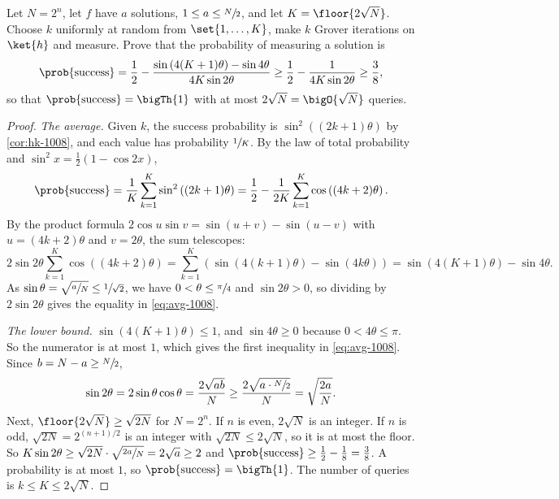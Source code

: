 \begin{exercisebox}
\begin{exercise}\label{ex:randomk-1008}\label{thm:randomk-1008}
    Let $N = 2^n$, let $f$ have $a$ solutions, $1 \leq a \leq \sfrac{N}{2}$, and let
    $K = \floor{2\sqrt{N}}$. Choose $k$ uniformly at random from $\set{1, \dots, K}$, make $k$ Grover
    iterations on $\ket{h}$ and measure. Prove that the probability of measuring a solution is
    \begin{equation}\label{eq:avg-1008}
        \prob{\text{success}} = \frac{1}{2} - \frac{\sin\left(4(K+1)\theta\right) - \sin 4\theta}{4K\sin 2\theta}
        \geq \frac{1}{2} - \frac{1}{4K\sin 2\theta} \geq \frac{3}{8},
    \end{equation}
    so that $\prob{\text{success}} = \bigTh{1}$ with at most $2\sqrt{N} = \bigO{\sqrt{N}}$ queries.
\end{exercise}
\tcblower
\begin{proof}
    \emph{The average.} Given $k$, the success probability is $\sin^2((2k+1)\theta)$ by
    \cref{cor:hk-1008}, and each value has probability $\sfrac{1}{K}$. By the law of total probability
    and $\sin^2 x = \frac{1}{2}(1 - \cos 2x)$,
    \[\prob{\text{success}} = \frac{1}{K}\sum_{k=1}^{K} \sin^2\left((2k+1)\theta\right)
        = \frac{1}{2} - \frac{1}{2K}\sum_{k=1}^{K} \cos\left((4k+2)\theta\right).\]
    By the product formula $2\cos u \sin v = \sin(u+v) - \sin(u-v)$ with $u = (4k+2)\theta$ and
    $v = 2\theta$, the sum telescopes:
    \[2\sin 2\theta \sum_{k=1}^{K} \cos\left((4k+2)\theta\right)
        = \sum_{k=1}^{K} \left(\sin\left(4(k+1)\theta\right) - \sin\left(4k\theta\right)\right)
        = \sin\left(4(K+1)\theta\right) - \sin 4\theta.\]
    As $\sin\theta = \sqrt{\sfrac{a}{N}} \leq \sfrac{1}{\sqrt{2}}$, we have $0 < \theta \leq \sfrac{\pi}{4}$
    and $\sin 2\theta > 0$, so dividing by $2\sin 2\theta$ gives the equality in \cref{eq:avg-1008}.

    \emph{The lower bound.} $\sin(4(K+1)\theta) \leq 1$, and $\sin 4\theta \geq 0$ because
    $0 < 4\theta \leq \pi$. So the numerator is at most $1$, which gives the first inequality in
    \cref{eq:avg-1008}. Since $b = N - a \geq \sfrac{N}{2}$,
    \[\sin 2\theta = 2\sin\theta\cos\theta = \frac{2\sqrt{ab}}{N} \geq \frac{2\sqrt{a \cdot \sfrac{N}{2}}}{N} = \sqrt{\frac{2a}{N}}.\]
    Next, $\floor{2\sqrt{N}} \geq \sqrt{2N}$ for $N = 2^n$. If $n$ is even, $2\sqrt{N}$ is an integer.
    If $n$ is odd, $\sqrt{2N} = 2^{(n+1)/2}$ is an integer with $\sqrt{2N} \leq 2\sqrt{N}$, so it is at
    most the floor. So $K\sin 2\theta \geq \sqrt{2N} \cdot \sqrt{\sfrac{2a}{N}} = 2\sqrt{a} \geq 2$
    and $\prob{\text{success}} \geq \frac{1}{2} - \frac{1}{8} = \frac{3}{8}$. A probability is at most
    $1$, so $\prob{\text{success}} = \bigTh{1}$. The number of queries is $k \leq K \leq 2\sqrt{N}$.
\end{proof}
\end{exercisebox}

